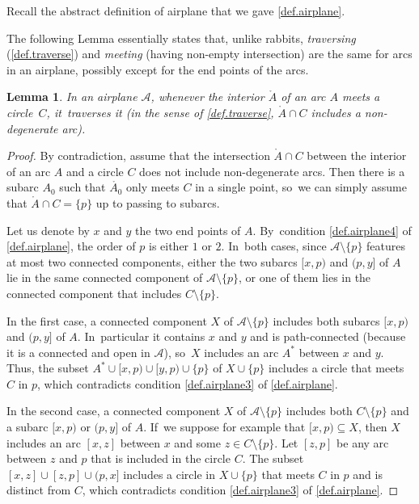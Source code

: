 \documentclass[JEP,XML,SOM,Unicode,NoFloatCountersInSection,published]{cedram}
\theoremstyle{plain}
\newtheorem{lemma}[theorem]{Lemma}
\theoremstyle{definition}
\theoremstyle{remark}
\newcommand{\A}{\mathcal{A}}
\begin{document}
Recall the abstract definition of airplane that we gave \cref{def.airplane}.

The following Lemma essentially states that, unlike rabbits, \textit{traversing} (\cref{def.traverse}) and \textit{meeting} (\ie having non-empty intersection) are the same for arcs in an airplane, possibly except for the end points of the arcs.

\begin{lemma}
\label{lem.airplane.meet.means.traverse}
In an airplane $\A$, whenever the interior $\mathring{A}$ of an arc $A$ meets a circle~$C$, it~traverses it (in the sense of \cref{def.traverse}, \ie $\mathring{A} \cap C$ includes a non-degenerate arc).
\end{lemma}

\begin{proof}
By contradiction, assume that the intersection $\mathring{A} \cap C$ between the interior of an arc $A$ and a circle $C$ does not include non-degenerate arcs.
Then there is a subarc $A_0$ such that $\mathring{A_0}$ only meets $C$ in a single point, so~we can simply assume that $\mathring{A} \cap C = \{p\}$ up to passing to subarcs.

Let us denote by $x$ and $y$ the two end points of $A$. By~condition \cref{def.airplane4} of \cref{def.airplane}, the order of $p$ is either $1$ or $2$. In~both cases, since $\A \setminus \{p\}$ features at most two connected components, either the two subarcs $[x,p)$ and $(p,y]$ of $A$ lie in the same connected component of $\A \setminus \{p\}$, or one of them lies in the connected component that includes $C \setminus \{p\}$.

In the first case, a connected component $X$ of $\A \setminus \{p\}$ includes both subarcs $[x,p)$ and $(p,y]$ of $A$. In~particular it contains $x$ and $y$ and is path-connected (because it is a connected and open in $\A$), so~$X$ includes an arc $A^*$ between $x$ and $y$.
Thus, the subset $A^* \cup [x,p) \cup [y,p) \cup \{p\}$ of $X \cup \{p\}$ includes a circle that meets $C$ in $p$, which contradicts condition \cref{def.airplane3} of \cref{def.airplane}.

In the second case, a connected component $X$ of $\A \setminus \{p\}$ includes both $C \setminus \{p\}$ and a subarc $[x,p)$ or $(p,y]$ of $A$. If~we suppose for example that $[x,p) \subseteq X$, then $X$ includes an arc $[x,z]$ between $x$ and some $z \in C \setminus \{p\}$.
Let $[z,p]$ be any arc between $z$ and $p$ that is included in the circle $C$.
The subset $[x,z] \cup [z,p] \cup (p,x]$ includes a circle in $X \cup \{p\}$ that meets $C$ in $p$ and is distinct from $C$, which contradicts condition \cref{def.airplane3} of \cref{def.airplane}.
\end{proof}
\end{document}
